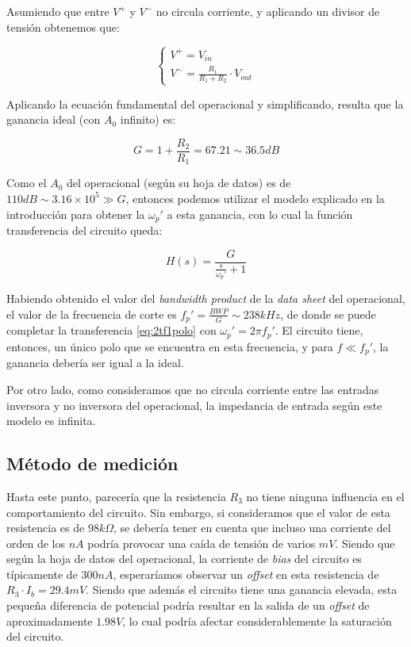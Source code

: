 \documentclass[../../main.tex]{subfiles}
\begin{document}
Asumiendo que entre $V^+$ y $V^-$ no circula corriente, y aplicando un divisor de tensi\'on obtenemos que:\par

 \[
	\left\{
 	\begin{array}{ll}
		V^+ = V_{in}\\
		V^- = \frac{R_1}{R_1+R_2} \cdot V_{out}
	\end{array}
	\right.
 \]

Aplicando la ecuaci\'on fundamental del operacional y simplificando, resulta que la ganancia ideal (con $A_0$ infinito) es:\par
\begin{equation} G = 1 + \frac{R_2}{R_1} = 67.21 \sim 36.5dB \end{equation}

Como el $A_0$ del operacional (seg\'un su hoja de datos) es de $110dB \sim 3.16\times 10^5 \gg G$, entonces podemos utilizar el modelo explicado en la introducci\'on para obtener la $\omega_p'$ a esta ganancia, con lo cual la funci\'on transferencia del circuito queda:

\begin{equation} \label{eq:2tf1polo} H(s) = \frac{G}{\frac{s}{\omega_p'} +1} \end{equation}

Habiendo obtenido el valor del \textit{bandwidth product} de la \textit{data sheet} del operacional, el valor de la frecuencia de corte es $f_p'= \frac{BWP}{G} \sim 238kHz$, de donde se puede completar la transferencia \ref{eq:2tf1polo} con $\omega_p'=2\pi f_p'$. El circuito tiene, entonces, un \'unico polo que se encuentra en esta frecuencia, y para $f \ll f_p'$, la ganancia deber\'ia ser igual a la ideal.\par

Por otro lado, como consideramos que no circula corriente entre las entradas inversora y no inversora del operacional, la impedancia de entrada seg\'un este modelo es infinita. \par

\subsection{M\'etodo de medici\'on}

Hasta este punto, parecer\'ia que la resistencia $R_3$ no tiene ninguna influencia en el comportamiento del circuito. Sin embargo, si consideramos que el valor de esta resistencia es de $98k\Omega$, se deber\'ia tener en cuenta que incluso una corriente del orden de los $nA$ podr\'ia provocar una ca\'ida de tensi\'on de varios $mV$. Siendo que seg\'un la hoja de datos del operacional, la corriente de \textit{bias} del circuito es t\'ipicamente de $300nA$, esperar\'iamos observar un \textit{offset} en esta resistencia de $R_3 \cdot I_{b} = 29.4mV$. Siendo que adem\'as el circuito tiene una ganancia elevada, esta peque\~na diferencia de potencial podr\'ia resultar en la salida de un \textit{offset} de aproximadamente $1.98V$, lo cual podr\'ia afectar considerablemente la saturaci\'on del circuito. \par
\end{document}
